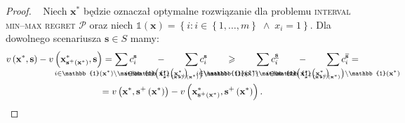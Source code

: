 \begin{proof}~\cite[$432$]{minmaxSurvey}
	Niech $\textbf{x}^{\ast}$ będzie oznaczał optymalne rozwiązanie dla problemu \textsc{interval min--max regret $\mathcal{P}$} oraz niech $\mathbb{1} \left( \textbf{x} \right) = \left\{ i : i \in \left\{ 1, \dots, m \right\} \; \wedge \; x_{i} = 1 \right\}$. Dla dowolnego scenariusza $\textbf{s} \in S$ mamy:
	\begin{gather*}
		v \left( \textbf{x}^{\ast}, \textbf{s} \right) - v \left( \textbf{x}^{\ast}_{\textbf{s}^{+} \left( \textbf{x}^{\ast} \right)}, \textbf{s} \right) = \sum_{\mathclap{i \in \mathbb{1} \left( \textbf{x}^{\ast} \right) \setminus \mathbb{1} \left( \textbf{x}^{\ast}_{\textbf{s}^{+} \left( \textbf{x}^{\ast} \right)} \right)}} c_{i}^{\textbf{s}} \qquad - \qquad \sum_{\mathclap{i \in \mathbb{1} \left( \textbf{x}^{\ast}_{\textbf{s}^{+} \left( \textbf{x}^{\ast} \right)} \right) \setminus \mathbb{1} \left( \textbf{x}^{\ast} \right)}} c_{i}^{\textbf{s}} \qquad \geqslant \qquad \sum_{\mathclap{i \in \mathbb{1} \left( \textbf{x}^{\ast} \right) \setminus \mathbb{1} \left( \textbf{x}^{\ast}_{\textbf{s}^{+} \left( \textbf{x}^{\ast} \right)} \right)}} c^{\underline{\textbf{s}}}_{i} \qquad - \qquad \sum_{\mathclap{i \in \mathbb{1} \left( \textbf{x}^{\ast}_{\textbf{s}^{+} \left( \textbf{x}^{\ast} \right)} \right) \setminus \mathbb{1} \left( \textbf{x}^{\ast} \right)}} c^{\overline{\textbf{s}}}_{i} = \\
		= v \left( \textbf{x}^{\ast}, \textbf{s}^{+} \left( \textbf{x}^{\ast} \right) \right) - v \left( \textbf{x}^{\ast}_{\textbf{s}^{+} \left( \textbf{x}^{\ast} \right)}, \textbf{s}^{+} \left( \textbf{x}^{\ast} \right) \right)\text{.}
	\end{gather*}
	

\end{proof}
